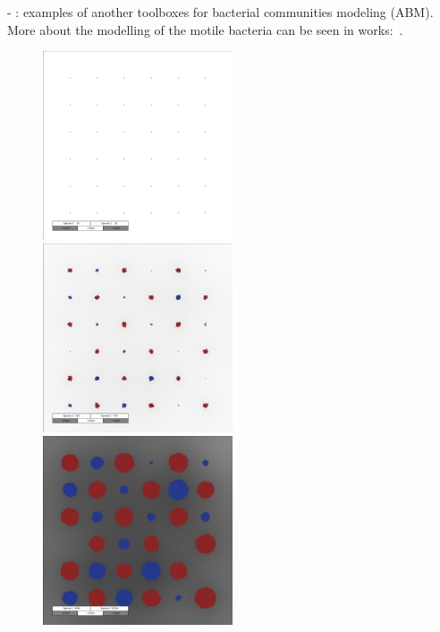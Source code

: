 \documentclass[10pt,A4paper]{article}
\begin{document}
- \cite{emonet_agentcell_2005, gorochowski_bsim_2012, li_nufeb_2019, kreft_bacsim_1998}: examples of another toolboxes for bacterial communities modeling (ABM).\\
More about the modelling of the motile bacteria can be seen in works:~\cite{decoene_microscopic_2011, rosser_modelling_2014, sokolov_physical_2012, li_amplified_2008}.
\begin{figure}
    \includegraphics[width=0.5\textwidth]{Figures/snapshot_00000000.png}%
    \includegraphics[width=0.5\textwidth]{Figures/snapshot_00006500.png}\\
    \includegraphics[width=0.5\textwidth]{Figures/snapshot_00013000.png}%

\end{figure}
\end{document}
